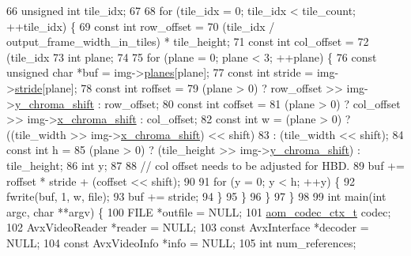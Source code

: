 \begin{DoxyCodeInclude}
{66   \textcolor{keywordtype}{unsigned} \textcolor{keywordtype}{int} tile\_idx;
67 
68   \textcolor{keywordflow}{for} (tile\_idx = 0; tile\_idx < tile\_count; ++tile\_idx) \{
69     \textcolor{keyword}{const} \textcolor{keywordtype}{int} row\_offset =
70         (tile\_idx / output\_frame\_width\_in\_tiles) * tile\_height;
71     \textcolor{keyword}{const} \textcolor{keywordtype}{int} col\_offset =
72         (tile\_idx %
73     \textcolor{keywordtype}{int} plane;
74 
75     \textcolor{keywordflow}{for} (plane = 0; plane < 3; ++plane) \{
76       \textcolor{keyword}{const} \textcolor{keywordtype}{unsigned} \textcolor{keywordtype}{char} *buf = img->\hyperlink{structaom__image_ac54dbc5237ca2914f9ec30105dfbe302}{planes}[plane];
77       \textcolor{keyword}{const} \textcolor{keywordtype}{int} stride = img->\hyperlink{structaom__image_a6dc693d7dbc9eb06c0cdde307ca58372}{stride}[plane];
78       \textcolor{keyword}{const} \textcolor{keywordtype}{int} roffset =
79           (plane > 0) ? row\_offset >> img->\hyperlink{structaom__image_a5acfc850c272e1377f3b7d58a95f3749}{y\_chroma\_shift} : row\_offset;
80       \textcolor{keyword}{const} \textcolor{keywordtype}{int} coffset =
81           (plane > 0) ? col\_offset >> img->\hyperlink{structaom__image_a83fdb3677275dc0e1e38701000447214}{x\_chroma\_shift} : col\_offset;
82       \textcolor{keyword}{const} \textcolor{keywordtype}{int} w = (plane > 0) ? ((tile\_width >> img->\hyperlink{structaom__image_a83fdb3677275dc0e1e38701000447214}{x\_chroma\_shift}) << shift)
83                                 : (tile\_width << shift);
84       \textcolor{keyword}{const} \textcolor{keywordtype}{int} h =
85           (plane > 0) ? (tile\_height >> img->\hyperlink{structaom__image_a5acfc850c272e1377f3b7d58a95f3749}{y\_chroma\_shift}) : tile\_height;
86       \textcolor{keywordtype}{int} y;
87 
88       \textcolor{comment}{// col offset needs to be adjusted for HBD.}
89       buf += roffset * stride + (coffset << shift);
90 
91       \textcolor{keywordflow}{for} (y = 0; y < h; ++y) \{
92         fwrite(buf, 1, w, file);
93         buf += stride;
94       \}
95     \}
96   \}
97 \}
98 
99 \textcolor{keywordtype}{int} main(\textcolor{keywordtype}{int} argc, \textcolor{keywordtype}{char} **argv) \{
100   FILE *outfile = NULL;
101   \hyperlink{structaom__codec__ctx}{aom\_codec\_ctx\_t} codec;
102   AvxVideoReader *reader = NULL;
103   \textcolor{keyword}{const} AvxInterface *decoder = NULL;
104   \textcolor{keyword}{const} AvxVideoInfo *info = NULL;
105   \textcolor{keywordtype}{int} num\_references;
}
\end{DoxyCodeInclude}
